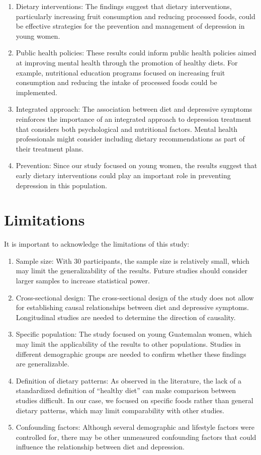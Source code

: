 \documentclass[jou]{apa7}
\begin{document}
\begin{enumerate}
	\item Dietary interventions: The findings suggest that dietary interventions, particularly increasing fruit consumption and reducing processed foods, could be effective strategies for the prevention and management of depression in young women.
	\item Public health policies: These results could inform public health policies aimed at improving mental health through the promotion of healthy diets. For example, nutritional education programs focused on increasing fruit consumption and reducing the intake of processed foods could be implemented.
	\item Integrated approach: The association between diet and depressive symptoms reinforces the importance of an integrated approach to depression treatment that considers both psychological and nutritional factors. Mental health professionals might consider including dietary recommendations as part of their treatment plans.
	\item Prevention: Since our study focused on young women, the results suggest that early dietary interventions could play an important role in preventing depression in this population.
\end{enumerate}

\section{Limitations}\label{limitaciones}

It is important to acknowledge the limitations of this study:

\begin{enumerate}
	\item Sample size: With 30 participants, the sample size is relatively small, which may limit the generalizability of the results. Future studies should consider larger samples to increase statistical power.
	\item Cross-sectional design: The cross-sectional design of the study does not allow for establishing causal relationships between diet and depressive symptoms. Longitudinal studies are needed to determine the direction of causality.
	\item Specific population: The study focused on young Guatemalan women, which may limit the applicability of the results to other populations. Studies in different demographic groups are needed to confirm whether these findings are generalizable.
	\item Definition of dietary patterns: As observed in the literature, the lack of a standardized definition of ``healthy diet'' can make comparison between studies difficult. In our case, we focused on specific foods rather than general dietary patterns, which may limit comparability with other studies.
	\item Confounding factors: Although several demographic and lifestyle factors were controlled for, there may be other unmeasured confounding factors that could influence the relationship between diet and depression.
\end{enumerate}
\end{document}

